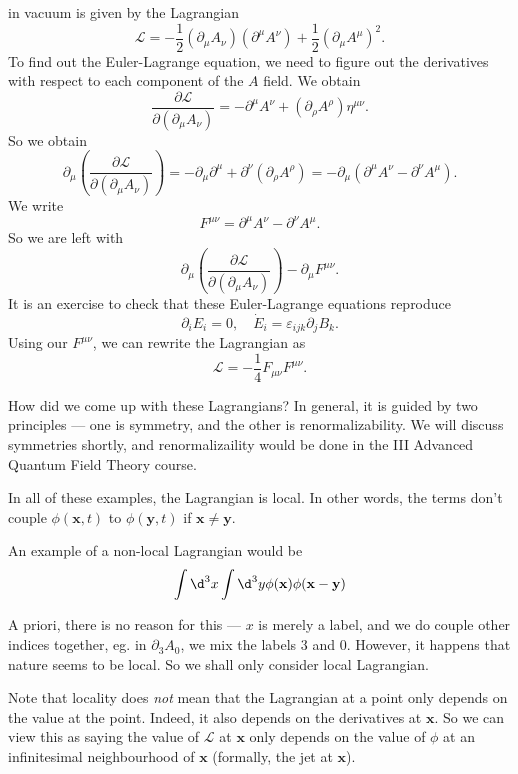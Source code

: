 \documentclass[a4paper]{article}
\begin{document}
\begin{eg}
   in vacuum is given by the Lagrangian
  \[
    \mathcal{L} = -\frac{1}{2} (\partial_\mu A_\nu)(\partial^\mu A^\nu) + \frac{1}{2}(\partial_\mu A^\mu)^2.
  \]
  To find out the Euler-Lagrange equation, we need to figure out the derivatives with respect to each component of the $A$ field. We obtain
  \[
    \frac{\partial \mathcal{L}}{\partial(\partial_\mu A_\nu)} = -\partial^\mu A^\nu + (\partial_\rho A^\rho) \eta^{\mu\nu}.
  \]
  So we obtain
  \[
    \partial_\mu \left(\frac{\partial \mathcal{L}}{\partial(\partial_\mu A_\nu)}\right) = - \partial_\mu\partial^\mu + \partial^\nu (\partial_\rho A^\rho) = - \partial_\mu (\partial^\mu A^\nu - \partial^\nu A^\mu).
  \]
  We write
  \[
    F^{\mu\nu} = \partial^\mu A^\nu - \partial^\nu A^\mu.
  \]
  So we are left with
  \[
    \partial_\mu \left(\frac{\partial \mathcal{L}}{\partial(\partial_\mu A_\nu)}\right) -\partial_\mu F^{\mu\nu}.
  \]
  It is an exercise to check that these Euler-Lagrange equations reproduce
  \[
    \partial_i E_i = 0,\quad \dot{E}_i = \varepsilon_{ijk} \partial_j B_k.
  \]
  Using our $F^{\mu\nu}$, we can rewrite the Lagrangian as
  \[
    \mathcal{L} = -\frac{1}{4} F_{\mu\nu}F^{\mu\nu}.
  \]
\end{eg}
How did we come up with these Lagrangians? In general, it is guided by two principles --- one is symmetry, and the other is renormalizability. We will discuss symmetries shortly, and renormalizaility would be done in the III Advanced Quantum Field Theory course.

In all of these examples, the Lagrangian is local. In other words, the terms don't couple $\phi(\mathbf{x}, t)$ to $\phi(\mathbf{y}, t)$ if $\mathbf{x} \not= \mathbf{y}$.
\begin{eg}
  An example of a non-local Lagrangian would be
  \[
    \int \d^3 x \int \d^3 y \phi(\mathbf{x}) \phi(\mathbf{x} - \mathbf{y})
  \]
\end{eg}
A priori, there is no reason for this --- $x$ is merely a label, and we do couple other indices together, eg. in $\partial_3 A_0$, we mix the labels $3$ and $0$. However, it happens that nature seems to be local. So we shall only consider local Lagrangian.

Note that locality does \emph{not} mean that the Lagrangian at a point only depends on the value at the point. Indeed, it also depends on the derivatives at $\mathbf{x}$. So we can view this as saying the value of $\mathcal{L}$ at $\mathbf{x}$ only depends on the value of $\phi$ at an infinitesimal neighbourhood of $\mathbf{x}$ (formally, the jet at $\mathbf{x}$).
\end{document}
